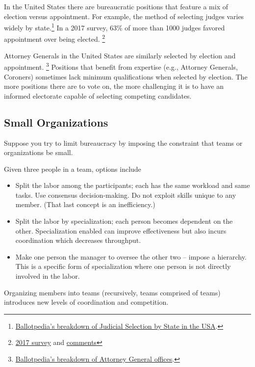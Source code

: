 In the United States there are bureaucratic positions that feature a mix of election versus appointment. For example, the method of selecting judges varies widely by state.\footnote{\href{https://ballotpedia.org/Judicial_selection_in_the_states}{Ballotpedia's breakdown of Judicial Selection by State in the USA}.} In a 2017 survey, 63\% of more than 1000 judges favored appointment over being elected. \footnote{\href{https://www.judges.org/news-and-info/the-age-old-question-should-judges-be-appointed-or-elected-heres-what-you-said/}{2017 survey} and \href{https://www.judges.org/wp-content/uploads/2020/03/Q1_Text.pdf}{comments}}

Attorney Generals in the United States are similarly  selected by election and appointment.
\footnote{\href{https://ballotpedia.org/Attorney_General_office_comparison}{Ballotpedia's breakdown of Attorney General offices}.}  Positions that benefit from expertise (e.g., Attorney Generals, Coroners) sometimes lack minimum qualifications when selected by election. The more positions there are to vote on, the more challenging it is to have an informed electorate capable of selecting competing candidates.

\subsection*{Small Organizations}

Suppose you try to limit bureaucracy by imposing the constraint that teams or organizations be small.

Given three people in a team, options include
\begin{itemize}
    \item Split the labor among the participants; each has the same workload and same tasks. Use consensus decision-making. Do not exploit skills unique to any member. (That last concept is an inefficiency.)
    \item Split the labor by specialization; each person becomes dependent on the other. Specialization enabled can improve effectiveness but also incurs coordination which decreases throughput.
    \item Make one person the manager to oversee the other two -- impose a hierarchy. This is a specific form of specialization where one person is not directly involved in the labor.
\end{itemize}
Organizing members into teams (recursively, teams comprised of teams) introduces new levels of coordination and competition.

